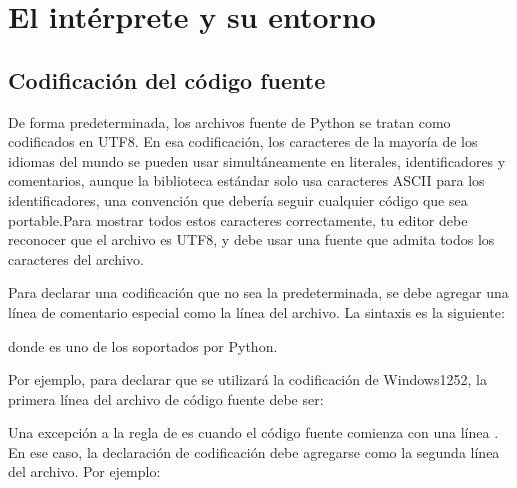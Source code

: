 \documentclass[a5paper,10pt,spanish]{sphinxmanual}
\begin{document}
\section{El intérprete y su entorno}
\label{\detokenize{tutorial/interpreter:the-interpreter-and-its-environment}}\label{\detokenize{tutorial/interpreter:tut-interp}}

\subsection{Codificación del código fuente}
\label{\detokenize{tutorial/interpreter:source-code-encoding}}\label{\detokenize{tutorial/interpreter:tut-source-encoding}}
\sphinxAtStartPar
De forma predeterminada, los archivos fuente de Python se tratan como codificados en UTF\sphinxhyphen{}8. En esa codificación, los caracteres de la mayoría de los idiomas del mundo se pueden usar simultáneamente en literales, identificadores y comentarios, aunque la biblioteca estándar solo usa caracteres ASCII para los identificadores, una convención que debería seguir cualquier código que sea portable.Para mostrar todos estos caracteres correctamente, tu editor debe reconocer que el archivo es UTF\sphinxhyphen{}8, y debe usar una fuente que admita todos los caracteres del archivo.

\sphinxAtStartPar
Para declarar una codificación que no sea la predeterminada, se debe agregar una línea de comentario especial como la  línea del archivo. La sintaxis es la siguiente:

\begin{sphinxVerbatim}[commandchars=\\\{\}]
\end{sphinxVerbatim}

\sphinxAtStartPar
donde  es uno de los  soportados por Python.

\sphinxAtStartPar
Por ejemplo, para declarar que se utilizará la codificación de Windows\sphinxhyphen{}1252, la primera línea del archivo de código fuente debe ser:

\begin{sphinxVerbatim}[commandchars=\\\{\}]
\end{sphinxVerbatim}

\sphinxAtStartPar
Una excepción a la regla de  es cuando el código fuente comienza con una línea {\hyperref[\detokenize{tutorial/appendix:tut-scripts}]{}}. En ese caso, la declaración de codificación debe agregarse como la segunda línea del archivo. Por ejemplo:
\end{document}
